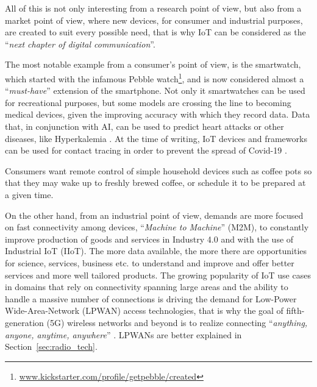 			All of this is not only interesting from a research point of view, but also from a market point of view, where new devices, for consumer and industrial purposes, are created to suit every possible need, that is why IoT can be considered as the ``\textit{next chapter of digital communication}''.
			
			The most notable example from a consumer's point of view, is the smartwatch, which started with the infamous Pebble watch\footnote{ \url{www.kickstarter.com/profile/getpebble/created}}, and is now considered almost a ``\textit{must-have}'' extension of the smartphone.
			Not only it smartwatches can be used for recreational purposes, but some models are crossing the line to becoming medical devices, given the improving accuracy with which they record data.
			Data that, in conjunction with AI, can be used to predict heart attacks \cite{7946780} or other diseases, like Hyperkalemia \cite{HYPERKALEMIA}.
			At the time of writing, IoT devices and frameworks can be used for contact tracing in order to prevent the spread of Covid-19 \cite{9181512}.
			
			Consumers want remote control of simple household devices such as coffee pots so that they may wake up to freshly	brewed coffee, or schedule it to be prepared at a given time.
			
			On the other hand, from an industrial point of view, demands are more focused on fast connectivity among devices, ``\textit{Machine to Machine}'' (M2M), to constantly improve production of goods and services in Industry 4.0 and with the use of Industrial IoT (IIoT).
			The more data available, the more there are opportunities for science, services, business etc. to understand and improve and offer better services and more well tailored products.
			The growing popularity of IoT use cases in domains that rely on connectivity spanning large areas and the ability to handle a massive number of connections is driving the demand for Low-Power Wide-Area-Network (LPWAN) access technologies, that is why the goal of fifth-generation (5G) wireless networks and beyond is to realize connecting ``\textit{anything, anyone, anytime, anywhere}'' \cite{7414384}.
			LPWANs are better explained in Section~\ref{sec:radio_tech}.
			
